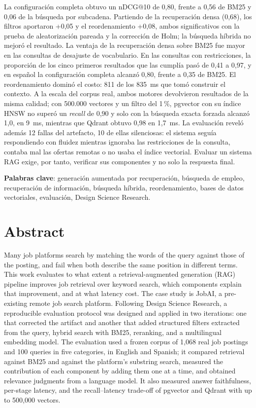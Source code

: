 La configuración completa obtuvo un nDCG@10 de 0,80, frente a 0,56 de BM25 y 0,06 de la búsqueda por subcadena. Partiendo de la recuperación densa (0,68), los filtros aportaron +0,05 y el reordenamiento +0,08, ambos significativos con la prueba de aleatorización pareada y la corrección de Holm; la búsqueda híbrida no mejoró el resultado. La ventaja de la recuperación densa sobre BM25 fue mayor en las consultas de desajuste de vocabulario. En las consultas con restricciones, la proporción de los cinco primeros resultados que las cumplía pasó de 0,41 a 0,97, y en español la configuración completa alcanzó 0,80, frente a 0,35 de BM25. El reordenamiento dominó el costo: 811 de los 835~ms que tomó construir el contexto. A la escala del corpus real, ambos motores devolvieron resultados de la misma calidad; con 500.000 vectores y un filtro del 1\,\%, pgvector con su índice HNSW no superó un \textit{recall} de 0,90 y solo con la búsqueda exacta forzada alcanzó 1,0, en 9~ms, mientras que Qdrant obtuvo 0,98 en 1,7~ms. La evaluación reveló además 12 fallas del artefacto, 10 de ellas silenciosas: el sistema seguía respondiendo con fluidez mientras ignoraba las restricciones de la consulta, contaba mal las ofertas remotas o no usaba el índice vectorial. Evaluar un sistema RAG exige, por tanto, verificar sus componentes y no solo la respuesta final.

\textbf{Palabras clave}: generación aumentada por recuperación, búsqueda de empleo, recuperación de información, búsqueda híbrida, reordenamiento, bases de datos vectoriales, evaluación, Design Science Research.

\newpage
\section*{Abstract}


Many job platforms search by matching the words of the query against those of the posting, and fail when both describe the same position in different terms. This work evaluates to what extent a retrieval-augmented generation (RAG) pipeline improves job retrieval over keyword search, which components explain that improvement, and at what latency cost. The case study is JobAI, a pre-existing remote job search platform. Following Design Science Research, a reproducible evaluation protocol was designed and applied in two iterations: one that corrected the artifact and another that added structured filters extracted from the query, hybrid search with BM25, reranking, and a multilingual embedding model. The evaluation used a frozen corpus of 1,068 real job postings and 100 queries in five categories, in English and Spanish; it compared retrieval against BM25 and against the platform's substring search, measured the contribution of each component by adding them one at a time, and obtained relevance judgments from a language model. It also measured answer faithfulness, per-stage latency, and the recall--latency trade-off of pgvector and Qdrant with up to 500,000 vectors.

